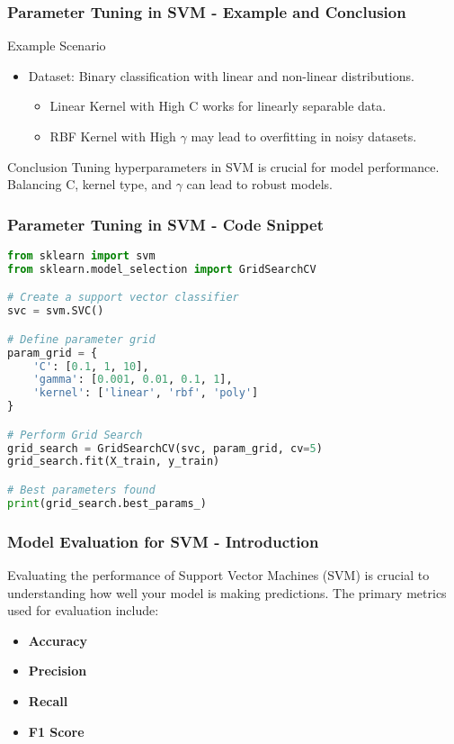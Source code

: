 \documentclass{beamer}
\begin{document}
\begin{frame}[fragile]
    \frametitle{Parameter Tuning in SVM - Example and Conclusion}
    \begin{block}{Example Scenario}
        \begin{itemize}
            \item Dataset: Binary classification with linear and non-linear distributions.
            \begin{itemize}
                \item Linear Kernel with High C works for linearly separable data.
                \item RBF Kernel with High $\gamma$ may lead to overfitting in noisy datasets.
            \end{itemize}
        \end{itemize}
    \end{block}
    \begin{block}{Conclusion}
        Tuning hyperparameters in SVM is crucial for model performance. Balancing C, kernel type, and $\gamma$ can lead to robust models.
    \end{block}
\end{frame}

\begin{frame}[fragile]
    \frametitle{Parameter Tuning in SVM - Code Snippet}
    \begin{lstlisting}[language=Python]
from sklearn import svm
from sklearn.model_selection import GridSearchCV

# Create a support vector classifier
svc = svm.SVC()

# Define parameter grid
param_grid = {
    'C': [0.1, 1, 10],
    'gamma': [0.001, 0.01, 0.1, 1],
    'kernel': ['linear', 'rbf', 'poly']
}

# Perform Grid Search
grid_search = GridSearchCV(svc, param_grid, cv=5)
grid_search.fit(X_train, y_train)

# Best parameters found
print(grid_search.best_params_)
    \end{lstlisting}
\end{frame}

\begin{frame}[fragile]
    \frametitle{Model Evaluation for SVM - Introduction}
    Evaluating the performance of Support Vector Machines (SVM) is crucial to understanding how well your model is making predictions. The primary metrics used for evaluation include:
    \begin{itemize}
        \item \textbf{Accuracy}
        \item \textbf{Precision}
        \item \textbf{Recall}
        \item \textbf{F1 Score}
    \end{itemize}
\end{frame}
\end{document}
